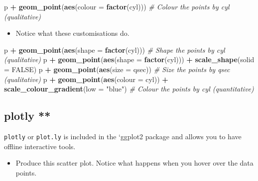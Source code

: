 \documentclass[]{article}
\newenvironment{Shaded}{\begin{snugshade}}{\end{snugshade}}
\newcommand{\CommentTok}[1]{\textcolor[rgb]{0.56,0.35,0.01}{\textit{#1}}}
\newcommand{\DataTypeTok}[1]{\textcolor[rgb]{0.13,0.29,0.53}{#1}}
\newcommand{\KeywordTok}[1]{\textcolor[rgb]{0.13,0.29,0.53}{\textbf{#1}}}
\newcommand{\NormalTok}[1]{#1}
\newcommand{\OperatorTok}[1]{\textcolor[rgb]{0.81,0.36,0.00}{\textbf{#1}}}
\newcommand{\OtherTok}[1]{\textcolor[rgb]{0.56,0.35,0.01}{#1}}
\newcommand{\StringTok}[1]{\textcolor[rgb]{0.31,0.60,0.02}{#1}}
\providecommand{\tightlist}{%
  \setlength{\itemsep}{0pt}\setlength{\parskip}{0pt}}
\begin{document}
\begin{Shaded}
\begin{Highlighting}[]
\NormalTok{p }\OperatorTok{+}\StringTok{ }\KeywordTok{geom_point}\NormalTok{(}\KeywordTok{aes}\NormalTok{(}\DataTypeTok{colour =} \KeywordTok{factor}\NormalTok{(cyl)))  }\CommentTok{# Colour the points by cyl (qualitative)}
\end{Highlighting}
\end{Shaded}

\begin{itemize}
\tightlist
\item
  Notice what these customisations do.
\end{itemize}

\begin{Shaded}
\begin{Highlighting}[]
\NormalTok{p }\OperatorTok{+}\StringTok{ }\KeywordTok{geom_point}\NormalTok{(}\KeywordTok{aes}\NormalTok{(}\DataTypeTok{shape =} \KeywordTok{factor}\NormalTok{(cyl)))  }\CommentTok{# Shape the points by cyl (qualitative)}
\NormalTok{p }\OperatorTok{+}\StringTok{ }\KeywordTok{geom_point}\NormalTok{(}\KeywordTok{aes}\NormalTok{(}\DataTypeTok{shape =} \KeywordTok{factor}\NormalTok{(cyl))) }\OperatorTok{+}\StringTok{ }\KeywordTok{scale_shape}\NormalTok{(}\DataTypeTok{solid =} \OtherTok{FALSE}\NormalTok{) }
\NormalTok{p }\OperatorTok{+}\StringTok{ }\KeywordTok{geom_point}\NormalTok{(}\KeywordTok{aes}\NormalTok{(}\DataTypeTok{size =}\NormalTok{ qsec))  }\CommentTok{# Size the points by qsec (qualitative)}
\NormalTok{p }\OperatorTok{+}\StringTok{ }\KeywordTok{geom_point}\NormalTok{(}\KeywordTok{aes}\NormalTok{(}\DataTypeTok{colour =}\NormalTok{ cyl)) }\OperatorTok{+}\StringTok{ }\KeywordTok{scale_colour_gradient}\NormalTok{(}\DataTypeTok{low =} \StringTok{"blue"}\NormalTok{)  }\CommentTok{# Colour the points by cyl (quantitative)}
\end{Highlighting}
\end{Shaded}

\hypertarget{plotly}{%
\subsection{plotly **}\label{plotly}}

\texttt{plotly} or \texttt{plot.ly} is included in the `ggplot2 package and allows you to have offline interactive tools.

\begin{itemize}
\tightlist
\item
  Produce this scatter plot. Notice what happens when you hover over the data points.
\end{itemize}
\end{document}
